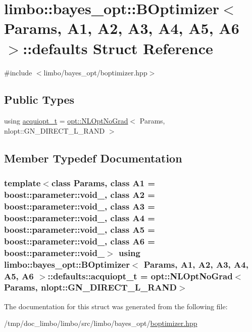 \hypertarget{structlimbo_1_1bayes__opt_1_1_b_optimizer_1_1defaults}{}\section{limbo\+:\+:bayes\+\_\+opt\+:\+:B\+Optimizer$<$ Params, A1, A2, A3, A4, A5, A6 $>$\+:\+:defaults Struct Reference}
\label{structlimbo_1_1bayes__opt_1_1_b_optimizer_1_1defaults}


{\ttfamily \#include $<$limbo/bayes\+\_\+opt/boptimizer.\+hpp$>$}

\subsection*{Public Types}
\begin{DoxyCompactItemize}
\item 
using \hyperlink{structlimbo_1_1bayes__opt_1_1_b_optimizer_1_1defaults_a354391108ed6c10e11e7c356b3a08c25}{acquiopt\+\_\+t} = \hyperlink{structlimbo_1_1opt_1_1_n_l_opt_no_grad}{opt\+::\+N\+L\+Opt\+No\+Grad}$<$ Params, nlopt\+::\+G\+N\+\_\+\+D\+I\+R\+E\+C\+T\+\_\+\+L\+\_\+\+R\+A\+ND $>$
\end{DoxyCompactItemize}


\subsection{Member Typedef Documentation}
\subsubsection[{\texorpdfstring{acquiopt\+\_\+t}{acquiopt_t}}]{\setlength{\rightskip}{0pt plus 5cm}template$<$class Params, class A1 = boost\+::parameter\+::void\+\_\+, class A2 = boost\+::parameter\+::void\+\_\+, class A3 = boost\+::parameter\+::void\+\_\+, class A4 = boost\+::parameter\+::void\+\_\+, class A5 = boost\+::parameter\+::void\+\_\+, class A6 = boost\+::parameter\+::void\+\_\+$>$ using {\bf limbo\+::bayes\+\_\+opt\+::\+B\+Optimizer}$<$ Params, A1, A2, A3, A4, A5, A6 $>$\+::{\bf defaults\+::acquiopt\+\_\+t} =  {\bf opt\+::\+N\+L\+Opt\+No\+Grad}$<$Params, nlopt\+::\+G\+N\+\_\+\+D\+I\+R\+E\+C\+T\+\_\+\+L\+\_\+\+R\+A\+ND$>$}\hypertarget{structlimbo_1_1bayes__opt_1_1_b_optimizer_1_1defaults_a354391108ed6c10e11e7c356b3a08c25}{}\label{structlimbo_1_1bayes__opt_1_1_b_optimizer_1_1defaults_a354391108ed6c10e11e7c356b3a08c25}


The documentation for this struct was generated from the following file\+:\begin{DoxyCompactItemize}
\item 
/tmp/doc\+\_\+limbo/limbo/src/limbo/bayes\+\_\+opt/\hyperlink{boptimizer_8hpp}{boptimizer.\+hpp}\end{DoxyCompactItemize}
